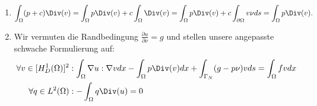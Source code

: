 \begin{solution}

\phantom{}

\begin{enumerate}[label = \textbf{\alph*)}]

\item

\begin{align*}
  \int_\Omega (p + c)\Div(v) = \int_\Omega p\Div(v) + c\int_\Omega \Div(v) =
  \int_\Omega p\Div(v) + c\int_{\partial\Omega} v \nu ds = \int_\Omega p\Div(v).
\end{align*}

\item 
Wir vermuten die Randbedingung $\frac{\partial u}{\partial \nu} = g$ und stellen
unsere angepasste schwache Formulierung auf:
\begin{align*}
  \forall v \in [H_D^1(\Omega)]^2&: \int_\Omega \nabla u : \nabla v dx - \int_\Omega p \Div(v) dx + \int_{\Gamma_N} (g - p\nu)v ds
  = \int_\Omega fv dx \\
  \forall q \in L^2(\Omega)&:  - \int_\Omega q\Div(u) = 0
\end{align*}

\end{enumerate}


\end{solution}

